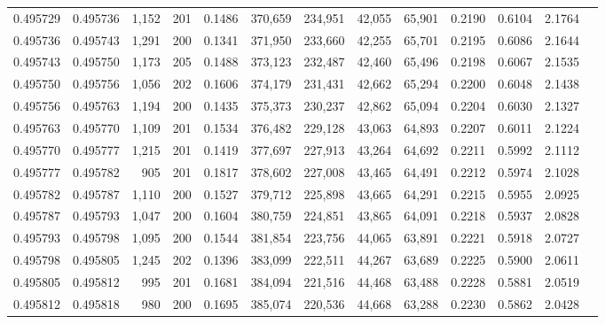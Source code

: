 \begin{tabular}{rrrrrrrrrrrrr}
0.495729 & 0.495736 & 1,152 & 201 &                                     0.1486 & 370,659 & 234,951 &  42,055 &  65,901 & 0.2190 & 0.6104 & 2.1764 \\
0.495736 & 0.495743 & 1,291 & 200 &                                     0.1341 & 371,950 & 233,660 &  42,255 &  65,701 & 0.2195 & 0.6086 & 2.1644 \\
0.495743 & 0.495750 & 1,173 & 205 &                                     0.1488 & 373,123 & 232,487 &  42,460 &  65,496 & 0.2198 & 0.6067 & 2.1535 \\
0.495750 & 0.495756 & 1,056 & 202 &                                     0.1606 & 374,179 & 231,431 &  42,662 &  65,294 & 0.2200 & 0.6048 & 2.1438 \\
0.495756 & 0.495763 & 1,194 & 200 &                                     0.1435 & 375,373 & 230,237 &  42,862 &  65,094 & 0.2204 & 0.6030 & 2.1327 \\
0.495763 & 0.495770 & 1,109 & 201 &                                     0.1534 & 376,482 & 229,128 &  43,063 &  64,893 & 0.2207 & 0.6011 & 2.1224 \\
0.495770 & 0.495777 & 1,215 & 201 &                                     0.1419 & 377,697 & 227,913 &  43,264 &  64,692 & 0.2211 & 0.5992 & 2.1112 \\
0.495777 & 0.495782 &   905 & 201 &                                     0.1817 & 378,602 & 227,008 &  43,465 &  64,491 & 0.2212 & 0.5974 & 2.1028 \\
0.495782 & 0.495787 & 1,110 & 200 &                                     0.1527 & 379,712 & 225,898 &  43,665 &  64,291 & 0.2215 & 0.5955 & 2.0925 \\
0.495787 & 0.495793 & 1,047 & 200 &                                     0.1604 & 380,759 & 224,851 &  43,865 &  64,091 & 0.2218 & 0.5937 & 2.0828 \\
0.495793 & 0.495798 & 1,095 & 200 &                                     0.1544 & 381,854 & 223,756 &  44,065 &  63,891 & 0.2221 & 0.5918 & 2.0727 \\
0.495798 & 0.495805 & 1,245 & 202 &                                     0.1396 & 383,099 & 222,511 &  44,267 &  63,689 & 0.2225 & 0.5900 & 2.0611 \\
0.495805 & 0.495812 &   995 & 201 &                                     0.1681 & 384,094 & 221,516 &  44,468 &  63,488 & 0.2228 & 0.5881 & 2.0519 \\
0.495812 & 0.495818 &   980 & 200 &                                     0.1695 & 385,074 & 220,536 &  44,668 &  63,288 & 0.2230 & 0.5862 & 2.0428 \\

\end{tabular}
